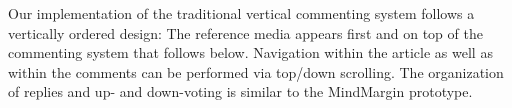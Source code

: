    
Our implementation of the traditional vertical commenting system follows a vertically ordered design: The reference media appears first and on top of the commenting system that follows below. Navigation within the article as well as within the comments can be performed via top/down scrolling. The organization of replies and up- and down-voting is similar to the MindMargin prototype.